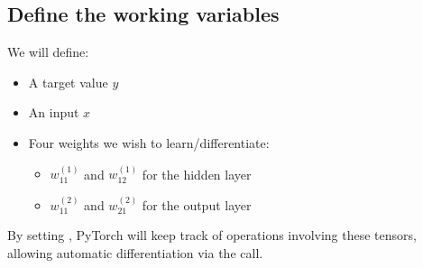 \documentclass[letterpaper,10pt,english]{jupyterBook}
\begin{document}
\subsection{Define the working variables}
\label{\detokenize{04:define-the-working-variables}}
\sphinxAtStartPar
We will define:
\begin{itemize}
\item {} 
\sphinxAtStartPar
A target value \(y\)

\item {} 
\sphinxAtStartPar
An input \(x\)

\item {} 
\sphinxAtStartPar
Four weights we wish to learn/differentiate:
\begin{itemize}
\item {} 
\sphinxAtStartPar
\(w_{11}^{(1)}\) and \(w_{12}^{(1)}\) for the hidden layer

\item {} 
\sphinxAtStartPar
\(w_{11}^{(2)}\) and \(w_{21}^{(2)}\) for the output layer

\end{itemize}

\end{itemize}

\sphinxAtStartPar
By setting , PyTorch will keep track of operations involving these tensors, allowing automatic differentiation via the  call.
\end{document}
